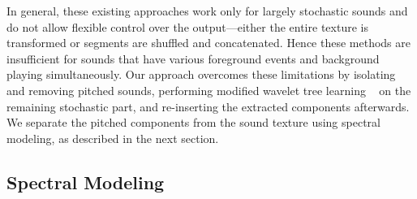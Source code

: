 \documentclass[review]{acmsiggraph}      %
\begin{document}
In general, these existing approaches work only for largely stochastic 
sounds and 
do not allow flexible control over the output---either the entire texture is 
transformed or segments are shuffled and concatenated. Hence 
these methods are insufficient for sounds that have various foreground events and 
background playing simultaneously.
Our approach overcomes these limitations by isolating and removing 
pitched sounds, performing modified wavelet tree learning 
~\cite{Dubnov02} on the  
remaining stochastic part, and re-inserting the extracted components 
afterwards. We separate the pitched components from the sound texture 
using spectral modeling, as described in the next section.




\subsection{Spectral Modeling}
\end{document}
